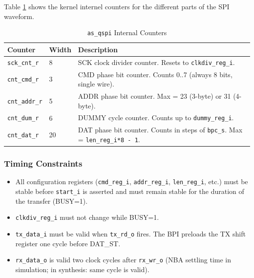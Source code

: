 Table \ref{tab:asqspi_cnt} shows the kernel internel counters for the different parts of the SPI waveform.
\begin{table}[H]
\caption{\texttt{as\_qspi} Internal Counters}
\label{tab:asqspi_cnt}
\centering
\begin{tabularx}{\textwidth}{|l|l|X|}
  \hline
  Counter & Width & Description \\
  \hline\hline
  \texttt{sck\_cnt\_r}  & 8 & SCK clock divider counter. Resets to \texttt{clkdiv\_reg\_i}. \\
  \hline
  \texttt{cnt\_cmd\_r}  & 3 & CMD phase bit counter. Counts 0..7 (always 8 bits, single wire). \\
  \hline
  \texttt{cnt\_addr\_r} & 5 & ADDR phase bit counter. Max = 23 (3-byte) or 31 (4-byte). \\
  \hline
  \texttt{cnt\_dum\_r}  & 6 & DUMMY cycle counter. Counts up to \texttt{dummy\_reg\_i}. \\
  \hline
  \texttt{cnt\_dat\_r}  & 20 & DAT phase bit counter. Counts in steps of \texttt{bpc\_s}. Max = \texttt{len\_reg\_i*8 - 1}. \\
  \hline
\end{tabularx}
\end{table}

\subsubsection{Timing Constraints}

\begin{itemize}
  \item All configuration registers (\texttt{cmd\_reg\_i}, \texttt{addr\_reg\_i},
    \texttt{len\_reg\_i}, etc.) must be stable before \texttt{start\_i} is asserted
    and must remain stable for the duration of the transfer (BUSY=1).
  \item \texttt{clkdiv\_reg\_i} must not change while BUSY=1.
  \item \texttt{tx\_data\_i} must be valid when \texttt{tx\_rd\_o} fires. The BPI
    preloads the TX shift register one cycle before DAT\_ST.
  \item \texttt{rx\_data\_o} is valid two clock cycles after \texttt{rx\_wr\_o}
    (NBA settling time in simulation; in synthesis: same cycle is valid).
\end{itemize}

